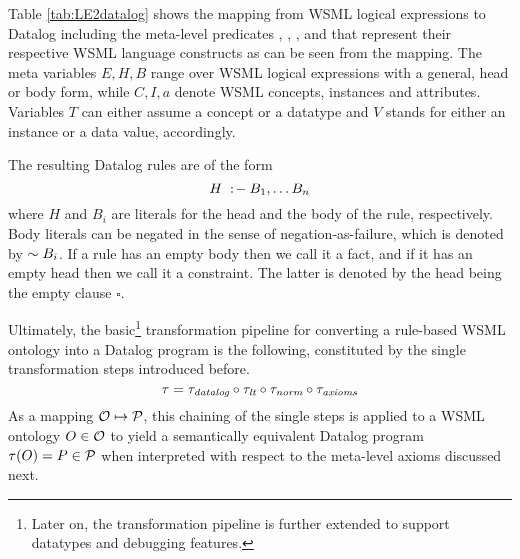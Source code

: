 Table \ref{tab:LE2datalog} shows the mapping from WSML logical
expressions to Datalog including the meta-level predicates \psco,
\pmo, \phval, \pitype and \potype that represent their respective
WSML language constructs as can be seen from the mapping. The meta
variables $E,H,B$ range over WSML logical expressions with a
general, head or body form, while $C,I,a$ denote WSML concepts,
instances and attributes. Variables $T$ can either assume a
concept or a datatype and $V$ stands for either an instance or a
data value, accordingly.

The resulting Datalog rules are of the form $$H \lprl B_1 , \dots
B_n$$ where $H$ and $B_i$ are literals for the head and the body
of the rule, respectively. Body literals can be negated in the
sense of negation-as-failure, which is denoted by $\dlognot B_i$.
If a rule has an empty body then we call it a fact, and if it has
an empty head then we call it a constraint. The latter is denoted
by the head being the empty clause $\square$.

\bigskip

Ultimately, the basic\footnote{Later on, the transformation
pipeline is further extended to support datatypes and debugging
features.} transformation pipeline for converting a rule-based
WSML ontology into a Datalog program is the following, constituted
by the single transformation steps introduced before.
\begin{displaymath}
    \tau = \transdlog \circ \translt \circ \transnorm \circ \transax
\end{displaymath}
As a mapping $\O \mapsto \P$, this chaining of the single steps is
applied to a WSML ontology $O \in \O$ to yield a semantically
equivalent Datalog program $\tau (O) = P \in \P$ when interpreted
with respect to the meta-level axioms discussed next.

